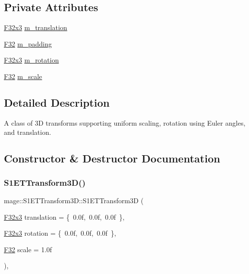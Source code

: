 \subsection*{Private Attributes}
\begin{DoxyCompactItemize}
\item 
\mbox{\hyperlink{namespacemage_a1e3c7a882af461f161caa1cbddaf1fa2}{F32x3}} \mbox{\hyperlink{classmage_1_1_s1_e_t_transform3_d_a0d91962088f646d341ac81415903412a}{m\+\_\+translation}}
\item 
\mbox{\hyperlink{namespacemage_aa97e833b45f06d60a0a9c4fc22ae02c0}{F32}} \mbox{\hyperlink{classmage_1_1_s1_e_t_transform3_d_aef080656b9e91c5e143fd4b9e5a61cfe}{m\+\_\+padding}}
\item 
\mbox{\hyperlink{namespacemage_a1e3c7a882af461f161caa1cbddaf1fa2}{F32x3}} \mbox{\hyperlink{classmage_1_1_s1_e_t_transform3_d_ae64da86a555645533a01748dc99459da}{m\+\_\+rotation}}
\item 
\mbox{\hyperlink{namespacemage_aa97e833b45f06d60a0a9c4fc22ae02c0}{F32}} \mbox{\hyperlink{classmage_1_1_s1_e_t_transform3_d_ab5e794d18aa0c35b0999014ee7e086e4}{m\+\_\+scale}}
\end{DoxyCompactItemize}


\subsection{Detailed Description}
A class of 3D transforms supporting uniform scaling, rotation using Euler angles, and translation. 

\subsection{Constructor \& Destructor Documentation}
\mbox{\label{classmage_1_1_s1_e_t_transform3_d_a0d1dd3a6816cb6593000d26eb6b6eac6}} 
\subsubsection{\texorpdfstring{S1\+E\+T\+Transform3\+D()}{S1ETTransform3D()}\hspace{0.1cm}{\footnotesize\ttfamily [1/4]}}
{\footnotesize\ttfamily mage\+::\+S1\+E\+T\+Transform3\+D\+::\+S1\+E\+T\+Transform3D (\begin{DoxyParamCaption}\item[{\mbox{\hyperlink{namespacemage_a1e3c7a882af461f161caa1cbddaf1fa2}{F32x3}}}]{translation = {\ttfamily \{~0.0f,~0.0f,~0.0f~\}},  }\item[{\mbox{\hyperlink{namespacemage_a1e3c7a882af461f161caa1cbddaf1fa2}{F32x3}}}]{rotation = {\ttfamily \{~0.0f,~0.0f,~0.0f~\}},  }\item[{\mbox{\hyperlink{namespacemage_aa97e833b45f06d60a0a9c4fc22ae02c0}{F32}}}]{scale = {\ttfamily 1.0f} }\end{DoxyParamCaption})\hspace{0.3cm}{\ttfamily [explicit]}, {\ttfamily [noexcept]}}

